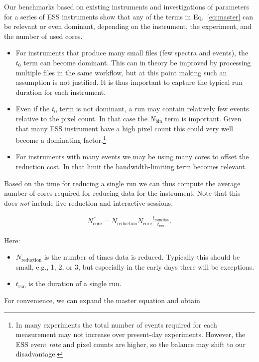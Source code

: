 \documentclass[a4paper,english,numbers=noenddot,bibliography=totoc,chapterprefix=on,DIV=12]{scrartcl}
\newcommand{\Treduction}{t_{\text{reduction}}}
\newcommand{\Trun}{t_{\text{run}}}
\newcommand{\Nbin}{N_{\text{bin}}}
\newcommand{\Ncore}{N_{\text{core}}}
\newcommand{\Nreduction}{N_{\text{reduction}}}
\begin{document}
Our benchmarks based on existing instruments and investigations of parameters for a series of ESS instruments show that any of the terms in Eq.~\eqref{eq:master} can be relevant or even dominant, depending on the instrument, the experiment, and the number of used cores.

\begin{itemize}
  \item 
    For instruments that produce many small files (few spectra and events), the $t_0$ term can become dominant.
    This can in theory be improved by processing multiple files in the same workflow, but at this point making such an assumption is not justified.
    It is thus important to capture the typical run duration for each instrument.
  \item
    Even if the $t_0$ term is not dominant, a run may contain relatively few events relative to the pixel count.
    In that case the $\Nbin$ term is important.
    Given that many ESS instrument have a high pixel count this could very well become a dominating factor.\footnote{In many experiments the total number of events required for each measurement may not increase over present-day experiments. However, the ESS event \emph{rate} and pixel counts are higher, so the balance may shift to our disadvantage.}
  \item
    For instruments with many events we may be using many cores to offset the reduction cost.
    In that limit the bandwidth-limiting term becomes relevant.
\end{itemize}

Based on the time for reducing a single run we can thus compute the average number of cores required for reducing data for the instrument.
Note that this does \emph{not} include live reduction and interactive sessions.

\begin{align}
  \overline{\Ncore} = \Nreduction \Ncore \frac{\Treduction}{\Trun}.
\end{align}

Here:

\begin{itemize}
  \item $\Nreduction$ is the number of times data is reduced.
    Typically this should be small, e.g., 1, 2, or 3, but especially in the early days there will be exceptions.
  \item $\Trun$ is the duration of a single run.
\end{itemize}

For convenience, we can expand the master equation and obtain
\end{document}
